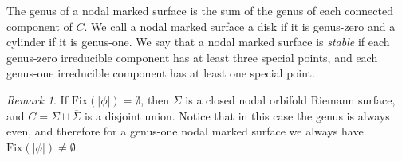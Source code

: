 \documentclass[11pt]{amsart}
\theoremstyle{definition}
\theoremstyle{remark}
\newtheorem{rmk}[dummy]{Remark}
\newcommand{\<}{\left<}
\renewcommand{\>}{\right>}
\numberwithin{equation}{section}
\begin{document}
The genus of a nodal marked surface is the sum of the genus of each connected component of $C$. We call a nodal marked surface a disk if it %
is genus-zero and %
a cylinder if it is genus-one.
We say that a nodal marked surface is \textit{stable} if each genus-zero irreducible component has at least three special points, and each genus-one irreducible component has at least one special point.

\begin{rmk}
    If $\text{Fix}(|\phi|)=\emptyset$, then $\Sigma$ is a closed nodal orbifold Riemann surface, and $C=\Sigma \sqcup \overline{\Sigma}$ is a disjoint union. Notice that in this case the genus is always even, and therefore for a genus-one nodal marked surface we always have $\text{Fix}(|\phi|)\ne \emptyset$.
\end{rmk}
\end{document}
